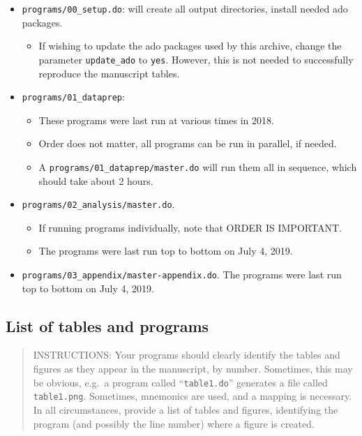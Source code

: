 \documentclass[
]{article}
\providecommand{\tightlist}{%
  \setlength{\itemsep}{0pt}\setlength{\parskip}{0pt}}
\begin{document}
\begin{itemize}
\tightlist
\item
  \texttt{programs/00\_setup.do}: will create all output directories,
  install needed ado packages.

  \begin{itemize}
  \tightlist
  \item
    If wishing to update the ado packages used by this archive, change
    the parameter \texttt{update\_ado} to \texttt{yes}. However, this is
    not needed to successfully reproduce the manuscript tables.
  \end{itemize}
\item
  \texttt{programs/01\_dataprep}:

  \begin{itemize}
  \tightlist
  \item
    These programs were last run at various times in 2018.
  \item
    Order does not matter, all programs can be run in parallel, if
    needed.
  \item
    A \texttt{programs/01\_dataprep/master.do} will run them all in
    sequence, which should take about 2 hours.
  \end{itemize}
\item
  \texttt{programs/02\_analysis/master.do}.

  \begin{itemize}
  \tightlist
  \item
    If running programs individually, note that ORDER IS IMPORTANT.
  \item
    The programs were last run top to bottom on July 4, 2019.
  \end{itemize}
\item
  \texttt{programs/03\_appendix/master-appendix.do}. The programs were
  last run top to bottom on July 4, 2019.
\end{itemize}

\hypertarget{list-of-tables-and-programs}{%
\subsection{List of tables and
programs}\label{list-of-tables-and-programs}}

\begin{quote}
INSTRUCTIONS: Your programs should clearly identify the tables and
figures as they appear in the manuscript, by number. Sometimes, this may
be obvious, e.g.~a program called ``\texttt{table1.do}'' generates a
file called \texttt{table1.png}. Sometimes, mnemonics are used, and a
mapping is necessary. In all circumstances, provide a list of tables and
figures, identifying the program (and possibly the line number) where a
figure is created.
\end{quote}
\end{document}
